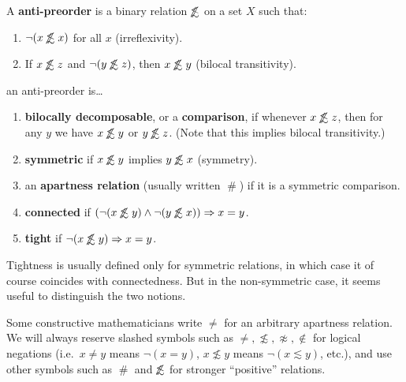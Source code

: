 \documentclass{article}
\def\apart{\mathrel{\#}}
\def\napprox{\not\approx}
\def\oapt{\mathrel{\!\not\,\not\lesssim}}
\def\leapx{\lesssim}
\let\implies\Rightarrow
\begin{document}
\begin{defn}
  A \textbf{anti-preorder} is a binary relation $\oapt$ on a set $X$ such that:
  \begin{enumerate}
  \item $\neg(x\oapt x)$ for all $x$ (irreflexivity).
  \item If $x\oapt z$ and $\neg(y\oapt z)$, then $x\oapt y$ (bilocal transitivity).
  \end{enumerate}
  an anti-preorder is\dots
  \begin{enumerate}[resume]
  \item \textbf{bilocally decomposable}, or a \textbf{comparison}, if whenever $x\oapt z$, then for any $y$ we have $x\oapt y$ or $y\oapt z$.
    (Note that this implies bilocal transitivity.)
  \item \textbf{symmetric} if $x\oapt y$ implies $y\oapt x$ (symmetry).
  \item an \textbf{apartness relation} (usually written $\apart$) if it is a symmetric comparison.
  \item \textbf{connected} if $(\neg(x\oapt y)\land \neg(y\oapt x))\implies x=y$.
  \item \textbf{tight} if $\neg(x\oapt y) \implies x=y$.
  \end{enumerate}
\end{defn}

Tightness is usually defined only for symmetric relations, in which case it of course coincides with connectedness.
But in the non-symmetric case, it seems useful to distinguish the two notions.

\begin{warn}
  Some constructive mathematicians write $\neq$ for an arbitrary apartness relation.
  We will always reserve slashed symbols such as $\neq,\not\leapx,\napprox,\notin$ for logical negations (i.e.\ $x\neq y$ means $\neg(x=y)$, $x\not\leapx y$ means $\neg(x\leapx y)$, etc.), and use other symbols such as $\apart$ and $\oapt$ for stronger ``positive'' relations.
\end{warn}
\end{document}
